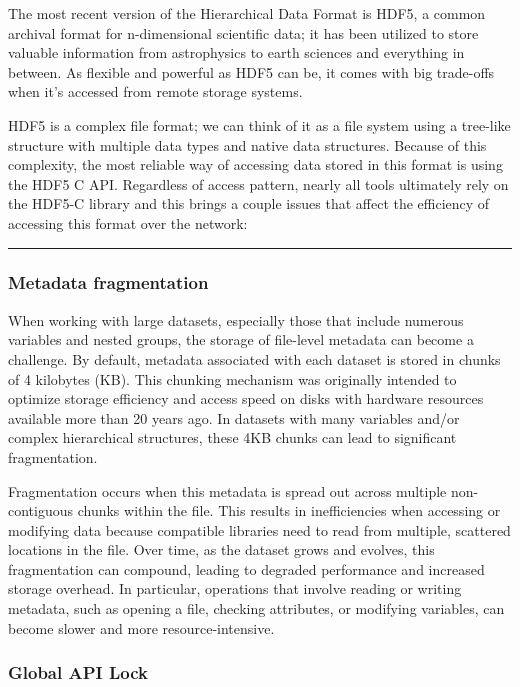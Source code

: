 \documentclass[
]{agujournal2019}
\begin{document}
The most recent version of the Hierarchical Data Format is HDF5, a
common archival format for n-dimensional scientific data; it has been
utilized to store valuable information from astrophysics to earth
sciences and everything in between. As flexible and powerful as HDF5 can
be, it comes with big trade-offs when it's accessed from remote storage
systems.

HDF5 is a complex file format; we can think of it as a file system using
a tree-like structure with multiple data types and native data
structures. Because of this complexity, the most reliable way of
accessing data stored in this format is using the HDF5 C API. Regardless
of access pattern, nearly all tools ultimately rely on the HDF5-C
library and this brings a couple issues that affect the efficiency of
accessing this format over the network:

\begin{center}\rule{0.5\linewidth}{0.5pt}\end{center}

\subsubsection{\texorpdfstring{\textbf{Metadata
fragmentation}}{Metadata fragmentation}}\label{metadata-fragmentation}

When working with large datasets, especially those that include numerous
variables and nested groups, the storage of file-level metadata can
become a challenge. By default, metadata associated with each dataset is
stored in chunks of 4 kilobytes (KB). This chunking mechanism was
originally intended to optimize storage efficiency and access speed on
disks with hardware resources available more than 20 years ago. In
datasets with many variables and/or complex hierarchical structures,
these 4KB chunks can lead to significant fragmentation.

Fragmentation occurs when this metadata is spread out across multiple
non-contiguous chunks within the file. This results in inefficiencies
when accessing or modifying data because compatible libraries need to
read from multiple, scattered locations in the file. Over time, as the
dataset grows and evolves, this fragmentation can compound, leading to
degraded performance and increased storage overhead. In particular,
operations that involve reading or writing metadata, such as opening a
file, checking attributes, or modifying variables, can become slower and
more resource-intensive.

\subsubsection{\texorpdfstring{\textbf{Global API
Lock}}{Global API Lock}}\label{global-api-lock}
\end{document}
